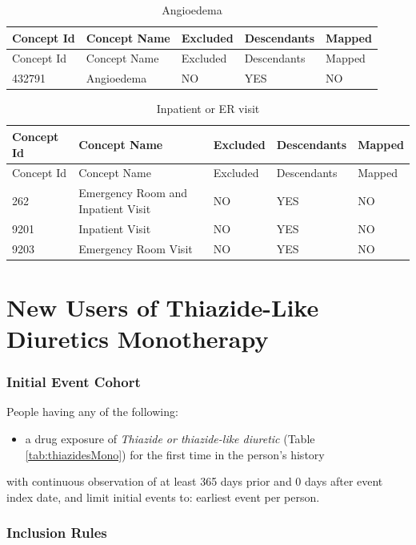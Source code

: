 \documentclass[11pt]{book}
\providecommand{\tightlist}{%
  \setlength{\itemsep}{0pt}\setlength{\parskip}{0pt}}
\theoremstyle{definition}
\theoremstyle{definition}
\theoremstyle{definition}
\theoremstyle{remark}
\begin{document}
\begin{longtable}[]{@{}lllll@{}}
\caption{\label{tab:angioedema} Angioedema}\tabularnewline
\toprule
Concept Id & Concept Name & Excluded & Descendants &
Mapped\tabularnewline
\midrule
\endfirsthead
\toprule
Concept Id & Concept Name & Excluded & Descendants &
Mapped\tabularnewline
\midrule
\endhead
432791 & Angioedema & NO & YES & NO\tabularnewline
\bottomrule
\end{longtable}

\begin{longtable}[]{@{}lllll@{}}
\caption{\label{tab:inpatientOrEr} Inpatient or ER visit}\tabularnewline
\toprule
Concept Id & Concept Name & Excluded & Descendants &
Mapped\tabularnewline
\midrule
\endfirsthead
\toprule
Concept Id & Concept Name & Excluded & Descendants &
Mapped\tabularnewline
\midrule
\endhead
262 & Emergency Room and Inpatient Visit & NO & YES & NO\tabularnewline
9201 & Inpatient Visit & NO & YES & NO\tabularnewline
9203 & Emergency Room Visit & NO & YES & NO\tabularnewline
\bottomrule
\end{longtable}

\section{New Users of Thiazide-Like Diuretics
Monotherapy}\label{ThiazidesMono}

\subsubsection*{Initial Event Cohort}\label{initial-event-cohort-4}

People having any of the following:

\begin{itemize}
\tightlist
\item
  a drug exposure of \emph{Thiazide or thiazide-like diuretic} (Table
  \ref{tab:thiazidesMono}) for the first time in the person's history
\end{itemize}

with continuous observation of at least 365 days prior and 0 days after
event index date, and limit initial events to: earliest event per
person.

\subsubsection*{Inclusion Rules}\label{inclusion-rules-1}
\end{document}
